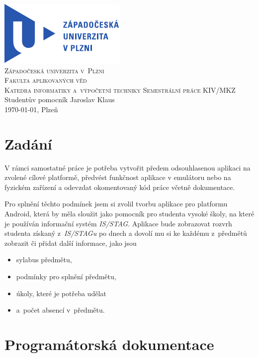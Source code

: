 \documentclass[12pt, a4paper]{article}
\begin{document}
	\begin{titlepage}
		\begin{center}
			\includegraphics{img/ZCULogo.pdf}\\[1cm]
			\textsc{\LARGE Západočeská univerzita v~Plzni}\\[0.1cm]
			\textsc{\Large Fakulta aplikovaných věd}\\[0.1cm]
			\textsc{\large Katedra informatiky a~výpočetní techniky}
			\vfill
			\textsc{\LARGE Semestrální práce KIV/MKZ}\\[0.2cm]
			\LARGE{Studentův pomocník}
			\vfill
			Jaroslav Klaus\\[0.2cm]
			\today, Plzeň
		\end{center}
	\end{titlepage}

	\tableofcontents
	\newpage

	\section{Zadání}
	V rámci samostatné práce je potřeba vytvořit předem odsouhlasenou aplikaci na zvolené cílové platformě, předvést funkčnost aplikace v emulátoru nebo na fyzickém zařízení a odevzdat okomentovaný kód práce včetně dokumentace.
	
	Pro splnění těchto podmínek jsem si zvolil tvorbu aplikace pro platformu Android, která by měla sloužit jako pomocník pro studenta vysoké školy, na které je používán informační systém \emph{IS/STAG}. Aplikace bude zobrazovat rozvrh studenta získaný z~\emph{IS/STAGu} po dnech a dovolí mu si ke každému z~předmětů zobrazit či přidat další informace, jako jsou
		\begin{itemize}
			\item sylabus předmětu,
			\item podmínky pro splnění předmětu,
			\item úkoly, které je potřeba udělat
			\item a~počet absencí v~předmětu.
		\end{itemize}
	
	\section{Programátorská dokumentace}
\end{document}

